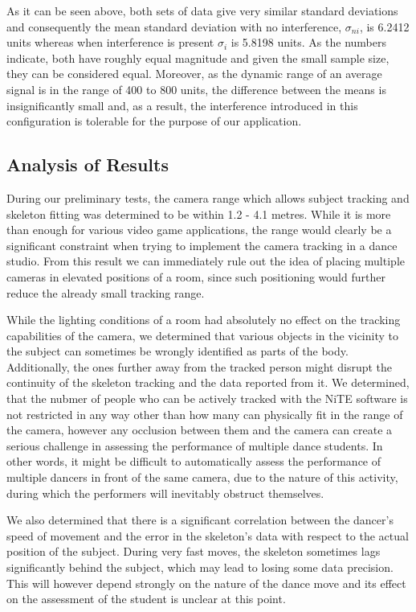 \documentclass[a4paper]{article}
\begin{document}
As it can be seen above, both sets of data give very similar standard deviations and consequently the mean standard deviation with no interference, $\sigma_{ni}$, is 6.2412 units whereas when interference is present $\sigma_{i}$ is 5.8198 units. As the numbers indicate, both have roughly equal magnitude and given the small sample size, they can be considered equal. Moreover, as the dynamic range of an average signal is in the range of 400 to 800 units, the difference between the means is insignificantly small and, as a result, the interference introduced in this configuration is tolerable for the purpose of our application.

\subsection{Analysis of Results}
\noindent
During our preliminary tests, the camera range which allows subject tracking and skeleton fitting was determined to be within 1.2 - 4.1 metres. While it is more than enough for various video game applications, the range would clearly be a significant constraint when trying to implement the camera tracking in a dance studio. From this result we can immediately rule out the idea of placing multiple cameras in elevated positions of a room, since such positioning would further reduce the already small tracking range.

\medskip \noindent While the lighting conditions of a room had absolutely no effect on the tracking capabilities of the camera, we determined that various objects in the vicinity to the subject can sometimes be wrongly identified as parts of the body. Additionally, the ones further away from the tracked person might disrupt the continuity of the skeleton tracking and the data reported from it. We determined, that the nubmer of people who can be actively tracked with the NiTE software is not restricted in any way other than how many can physically fit in the range of the camera, however any occlusion between them and the camera can create a serious challenge in assessing the performance of multiple dance students. In other words, it might be difficult to automatically assess the performance of multiple dancers in front of the same camera, due to the nature of this activity, during which the performers will inevitably obstruct themselves.

\medskip \noindent We also determined that there is a significant correlation between the dancer's speed of movement and the error in the skeleton's data with respect to the actual position of the subject. During very fast moves, the skeleton sometimes lags significantly behind the subject, which may lead to losing some data precision. This will however depend strongly on the nature of the dance move and its effect on the assessment of the student is unclear at this point.
\end{document}
